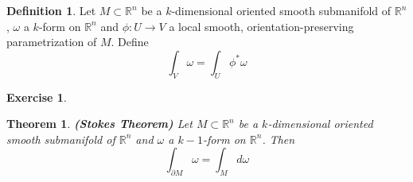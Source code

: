 \documentclass[12pt]{amsart}
\newtheorem{thm}{Theorem}[subsection]
\theoremstyle{definition}
\newtheorem{defn}[definition]{Definition}
\theoremstyle{remark}
\theoremstyle{definition}
\newtheorem{ex}[definition]{Exercise}
\newcommand{\om}{\omega}
\newcommand{\R}{\mathbb{R}}
\begin{document}
	\begin{defn}
		Let $M \subset \R^n$ be a $k$-dimensional oriented smooth submanifold of $\R^n$, $\om$ a $k$-form on $\R^n$ and $\phi: U \rightarrow V$ a local smooth, orientation-preserving parametrization of $M$. Define $$\int_V \om = \int_U \phi^*\om $$
	\end{defn} 

	\begin{ex}
		
	\end{ex}

	\begin{thm}{\textbf{(Stokes Theorem)}}
		Let $M \subset \R^n$ be a $k$-dimensional oriented smooth submanifold of $\R^n$ and $\om$ a $k-1$-form on $\R^n$. Then $$\int_{\partial M} \om = \int_M d \om$$
	\end{thm}
\end{document}
